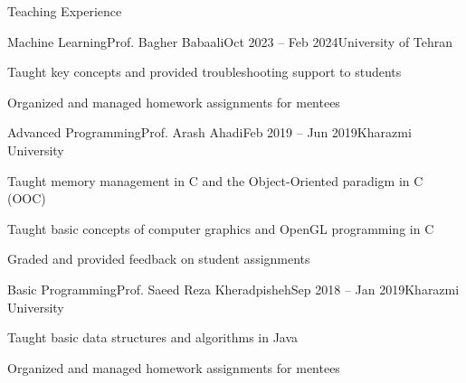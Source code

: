 \documentclass[]{main}
\begin{document}
\begin{section}{Teaching Experience}
 \begin{subsection}{Machine Learning}{Prof. Bagher Babaali}{Oct 2023 -- Feb 2024}{University of Tehran}
     \item Taught key concepts and provided troubleshooting support to students
     \item Organized and managed homework assignments for mentees
 \end{subsection}
 \begin{subsection}{Advanced Programming}{Prof. Arash Ahadi}{Feb 2019 -- Jun 2019}{Kharazmi University}
     \item Taught memory management in C and the Object-Oriented paradigm in C (OOC) \;\href{https://github.com/ckoliber/ooc_lecture}{\faExternalLink*}
     \item Taught basic concepts of computer graphics and OpenGL programming in C \;\href{https://github.com/ckoliber/opengl}{\faExternalLink*}
     \item Graded and provided feedback on student assignments
 \end{subsection}
 \begin{subsection}{Basic Programming}{Prof. Saeed Reza Kheradpisheh}{Sep 2018 -- Jan 2019}{Kharazmi University}
     \item Taught basic data structures and algorithms in Java
     \item Organized and managed homework assignments for mentees \;\href{https://github.com/ckoliber/Phy97Sources}{\faExternalLink*}
 \end{subsection}
\end{section}
\end{document}
